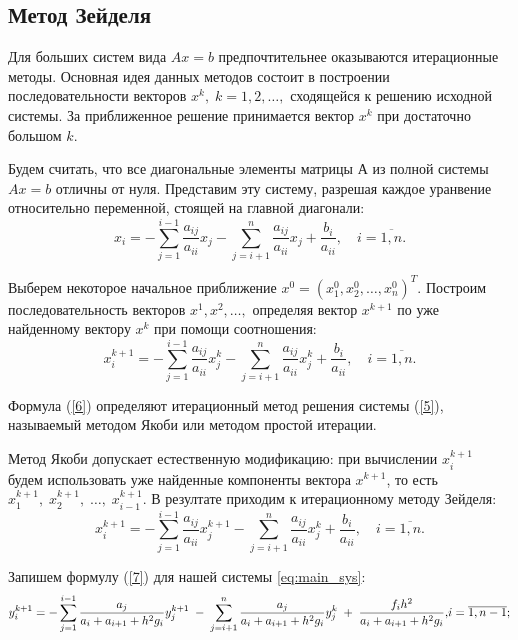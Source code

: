 \documentclass[a4paper,12pt]{article}
\begin{document}
{\subsection{Метод Зейделя}
\hspace*{1.25cm}Для больших систем вида $Ax=b$ предпочтительнее оказываются итерационные методы. 
Основная идея данных методов состоит в построении последовательности векторов $x^k, \; k=1,2,\dots,$ 
сходящейся к решению исходной системы. За приближенное решение принимается вектор $x^k$ при достаточно большом $k$.

Будем считать, что все диагональные элементы матрицы $А$ из полной системы $Ax=b$ отличны от нуля. 
Представим эту систему, разрешая каждое уранвение относительно переменной, стоящей на главной диагонали: 
\begin{equation}
x_i = - \sum\limits_{j=1}^{i-1} \frac{a_{ij}}{a_{ii}}x_j - \sum\limits_{j=i+1}^n \frac{a_{ij}}{a_{ii}}x_j+\frac{b_i}{a_{ii}}, \quad i = \overline{1,n}.
 \label{5}
\end{equation}

Выберем некоторое начальное приближение $x^0=(x_1^0, x_2^0, {\dots}, x_n^0)^T$. 
Построим последова\-тель\-ность векторов $x^1, x^2, {\dots},$ определяя вектор $x^{k+1}$ по уже найденному вектору $x^k$ при помощи соотношения: 
\begin{equation}
x_i^{k+1}= - \sum\limits_{j=1}^{i-1} \frac{a_{ij}}{a_{ii}}x_j^k - \sum\limits_{j=i+1}^n \frac{a_{ij}}{a_{ii}}x_j^k+\frac{b_i}{a_{ii}}, \quad i = \overline{1,n}. 
 \label{6}
\end{equation}

Формула (\ref{6}) определяют итерационный метод решения системы (\ref{5}), называемый мето\-дом Якоби или методом простой итерации.

Метод Якоби допускает естественную модификацию: при вычислении $x_i^{k+1}$ 
будем использовать уже найденные компоненты вектора $x^{k+1}$, то есть $x_1^{k+1},\;x_2^{k+1},\;\dots,\;x_{i-1}^{k+1}$. 
В резултате приходим к итерационному методу Зейделя:
\begin{equation}
    x_i^{k+1}= - \sum\limits_{j=1}^{i-1} \frac{a_{ij}}{a_{ii}}x_j^{k+1} - \sum\limits_{j=i+1}^n \frac{a_{ij}}{a_{ii}}x_j^k+\frac{b_i}{a_{ii}}, \quad i = \overline{1,n}. 
     \label{7}
\end{equation}

Запишем формулу (\ref{7}) для нашей системы \eqref{eq:main_sys}:
\begin{equation}
    y_i^{k+1}=  -\sum\limits_{j=1}^{i-1}\frac{a_j}{a_i+a_{i+1}+h^2 g_i}y_j^{k+1} \; - \;\sum\limits_{j=i+1}^{n}\frac{a_{j}}{a_i+a_{i+1}+h^2 g_i}y_j^k\; +\; \frac{f_i h^2}{a_i+a_{i+1}+h^2 g_i},$$$$
    i=\overline{1, n-1};
     \label{8}
\end{equation}

}
\end{document}

